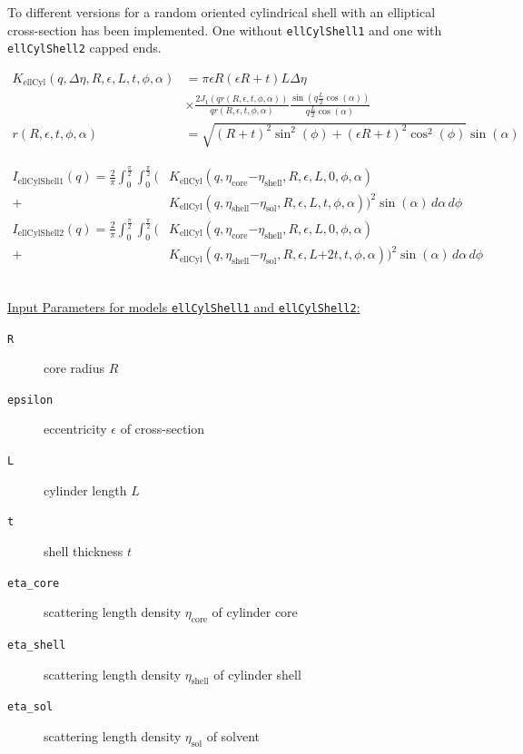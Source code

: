 To different versions for a random oriented cylindrical shell with
an elliptical cross-section has been implemented. One without
\texttt{ellCylShell1} and one with \texttt{ellCylShell2} capped
ends.

\begin{align}
K_\text{ellCyl}(q,\Delta\eta,R,\epsilon,L,t,\phi,\alpha) &= \pi \epsilon R(\epsilon R+t) L
\Delta \eta \\
    & \times \frac{2J_1\left(q r(R,\epsilon,t,\phi,\alpha) \right)}{q r(R,\epsilon,t,\phi,\alpha)}
    \frac{\sin(q \frac{L}{2}\cos(\alpha))}{q\frac{L}{2}\cos(\alpha)} \nonumber \\
r(R,\epsilon,t,\phi,\alpha) &= \sqrt{(R+t)^2\sin^2(\phi)+(\epsilon R+t)^2\cos^2(\phi)} \sin(\alpha)
\end{align}

\begin{align}
I_\text{ellCylShell1}(q) = \frac{2}{\pi}\int_0^{\frac{\pi}{2}} \!\! \int_0^{\frac{\pi}{2}} \biggl(
  &
  K_\text{ellCyl}\left(q,\eta_\text{core}\mathord-\eta_\text{shell},R,\epsilon,L,0,\phi,\alpha\right) \\
+&  K_\text{ellCyl}\left(q,\eta_\text{shell}\mathord-\eta_\text{sol},R,\epsilon,L,t,\phi,\alpha\right)
\biggr)^2 \sin(\alpha) \,d\alpha\, d\phi \nonumber \\
I_\text{ellCylShell2}(q) = \frac{2}{\pi}\int_0^{\frac{\pi}{2}} \!\!  \int_0^{\frac{\pi}{2}}  \biggl(
 &  K_\text{ellCyl}\left(q,\eta_\text{core}\mathord-\eta_\text{shell},R,\epsilon,L,0,\phi,\alpha\right) \\
+&  K_\text{ellCyl}\left(q,\eta_\text{shell}\mathord-\eta_\text{sol},R,\epsilon,L\mathord+2t,t,\phi,\alpha\right) \biggr)^2 \sin(\alpha) \,d\alpha \,d\phi  \nonumber
\end{align}


\vspace{5mm}

\hspace{1pt}\\
\underline{Input Parameters for models \texttt{ellCylShell1} and \texttt{ellCylShell2}:}\\
\begin{description}
\item[\texttt{R}] core radius $R$
\item[\texttt{epsilon}] eccentricity $\epsilon$ of cross-section
\item[\texttt{L}] cylinder length $L$
\item[\texttt{t}] shell thickness $t$
\item[\texttt{eta\_core}] scattering length density $\eta_\text{core}$ of cylinder core
\item[\texttt{eta\_shell}] scattering length density $\eta_\text{shell}$ of cylinder shell
\item[\texttt{eta\_sol}] scattering length density $\eta_\text{sol}$ of solvent
\end{description}

